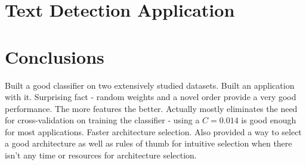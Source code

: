 \documentclass[12pt,a4paper,oneside,english]{UPBThesis}
\begin{document}
\chapter{Text Detection Application}
\label{chap:TextDetectionApplication}

\chapter{Conclusions}
\label{chap:Conclusions}

Built a good classifier on two extensively studied datasets.
Built an application with it.
Surprising fact - random weights and a novel order provide a very good performance. The more features the better.
Actually mostly eliminates the need for cross-validation on training the classifier - using a $C = 0.014$ is good enough for most applications. Faster architecture selection. Also provided a way to select a good architecture as well as rules of thumb for intuitive selection when there isn't any time or resources for architecture selection.




\appendix
\end{document}
